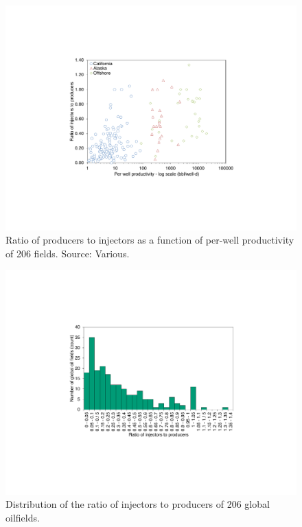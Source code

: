 \documentclass[11pt]{report}
\begin{document}
\begin{figure}[t]
\includegraphics[width=0.8\columnwidth]{images/inj_prod.pdf}
\caption{Ratio of producers to injectors as a function of per-well productivity of 206 fields. Source: Various.}
\label{fig:inj_prod}
\end{figure}

\begin{figure}[t]
\includegraphics[width=0.8\columnwidth]{images/inj_prod_hist.pdf}
\caption{Distribution of the ratio of injectors to producers of 206 global oilfields.}
\label{fig:inj_prod_hist}
\end{figure}
\end{document}
